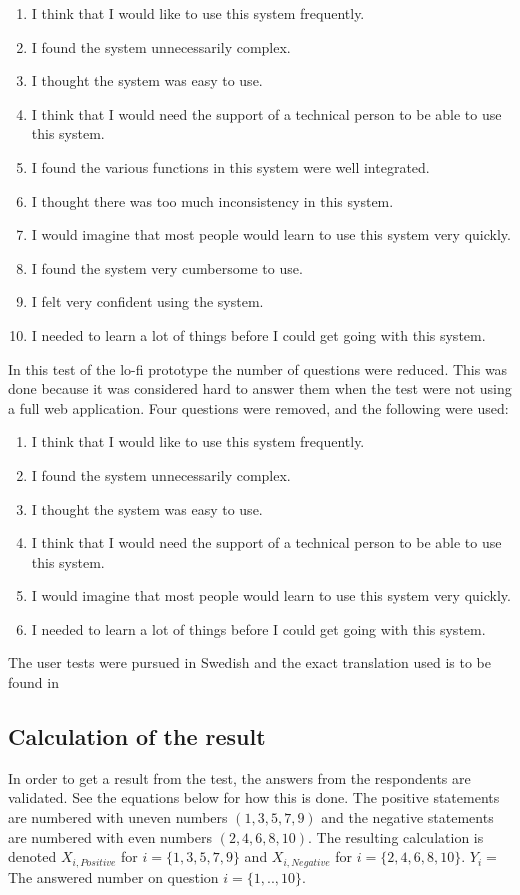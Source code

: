 \documentclass{article}
\begin{document}
	\begin{enumerate}
		\item I think that I would like to use this system frequently.
		\item I found the system unnecessarily complex.
		\item I thought the system was easy to use.
		\item I think that I would need the support of a technical person to be able to use this system.
		\item I found the various functions in this system were well integrated.
		\item I thought there was too much inconsistency in this system.
		\item I would imagine that most people would learn to use this system very quickly.
		\item I found the system very cumbersome to use.
		\item I felt very confident using the system.
		\item I needed to learn a lot of things before I could get going with this system.
	\end{enumerate}
	
	In this test of the lo-fi prototype the number of questions were reduced. This was done because it was considered hard to answer them when the test were not using a full web application. Four questions were removed, and the following were used: 
	
	\begin{enumerate}
		\item I think that I would like to use this system frequently.
		\item I found the system unnecessarily complex.
		\item I thought the system was easy to use.
		\item I think that I would need the support of a technical person to be able to use this system.
		\item I would imagine that most people would learn to use this system very quickly.
		\item I needed to learn a lot of things before I could get going with this system.
	\end{enumerate}

	The user tests were pursued in Swedish and the exact translation used is to be found in 
	
	\subsection{Calculation of the result}
	In order to get a result from the test, the answers from the respondents are validated. See the equations below for how this is done. The positive statements are numbered with uneven numbers $(1, 3, 5, 7, 9)$ and the negative statements are numbered with even numbers $(2, 4, 6, 8, 10)$. The resulting calculation is denoted $X_{i,Positive}$ for $ i = \{1,3,5,7,9\}$ and $X_{i,Negative}$ for $ i = \{2,4,6,8,10\}$. $Y_i = $ The answered number on question $ i = \{1,..,10\}$.
	
\end{document}

